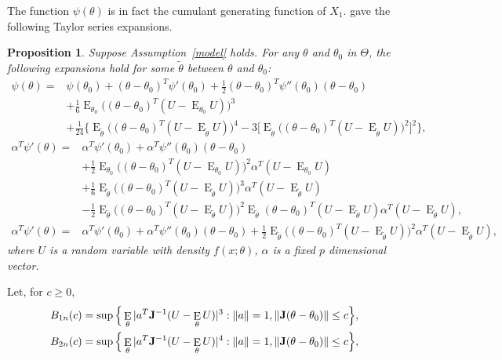 \documentclass[11pt, letterpaper]{article}
\DeclareMathOperator{\myE}{E}
\theoremstyle{plain}
\newtheorem{proposition}{\quad\quad Proposition}
\theoremstyle{definition}
\theoremstyle{remark}
\begin{document}
The function $\psi(\theta)$ is in fact the cumulant generating function of $X_1$. 
\cite{portnoy1988asymptotic} gave the following Taylor series expansions.
\begin{proposition}\label{Taylor}
    Suppose Assumption~\ref{model} holds.
    For any $\theta$ and $\theta_0$ in $\Theta$, the following expansions hold for some $\tilde{\theta}$ between $\theta$ and $\theta_0$:
    $$
    \begin{aligned}
        \psi(\theta)=&\psi(\theta_0)+(\theta-\theta_0)^T \psi'(\theta_0)+\frac{1}{2}(\theta-\theta_0)^T \psi''(\theta_0) (\theta-\theta_0)\\
        &+\frac{1}{6}\myE_{\theta_0}\Big((\theta-\theta_0)^T (U-\myE_{\theta_0}U)\Big)^3\\
        &+\frac{1}{24}\Big\{
            \myE_{\tilde{\theta}}\Big((\theta-\theta_0)^T (U-\myE_{\tilde\theta}U)\Big)^4-
            3\big[\myE_{\tilde{\theta}}\big((\theta-\theta_0)^T (U-\myE_{\tilde\theta}U)\big)^2\big]^2
            \Big\},
    \end{aligned}
    $$
    $$
    \begin{aligned}
        \alpha^T\psi'(\theta)=&\alpha^T \psi'(\theta_0)+\alpha^T \psi''(\theta_0) (\theta-\theta_0)\\
        &+\frac{1}{2}\myE_{\theta_0}\big((\theta-\theta_0)^T (U-\myE_{\theta_0}U)\big)^2 \alpha^T (U-\myE_{\theta_0}U)\\
        &+\frac{1}{6}
            \myE_{\tilde{\theta}}\big((\theta-\theta_0)^T (U-\myE_{\tilde\theta}U)\big)^3 \alpha^T (U-\myE_{\tilde\theta}U)\\
            &-\frac{1}{2}
            \myE_{\tilde{\theta}}\big((\theta-\theta_0)^T (U-\myE_{\tilde\theta}U)\big)^2
            \myE_{\tilde{\theta}}(\theta-\theta_0)^T (U-\myE_{\tilde\theta}U) \alpha^T (U-\myE_{\tilde\theta}U),
    \end{aligned}
    $$
    $$
    \begin{aligned}
        \alpha^T\psi'(\theta)=&\alpha^T \psi'(\theta_0)+\alpha^T \psi''(\theta_0) (\theta-\theta_0)
        +\frac{1}{2}\myE_{\tilde\theta}\big((\theta-\theta_0)^T (U-\myE_{\tilde\theta}U)\big)^2 \alpha^T (U-\myE_{\tilde\theta}U),
    \end{aligned}
    $$
    where $U$ is a random variable with density $f(x;\theta)$, $\alpha$ is a fixed $p$ dimensional vector.
\end{proposition}

Let, for $c\geq 0$,
$$
\begin{aligned}
    B_{1n}(c)&=\sup\Big\{\myE_{\theta}|a^T \BJ^{-1}(U-\myE_\theta U)|^3: \|a\|=1, \|\BJ(\theta-\theta_0)\|\leq c\Big\},\\
    B_{2n}(c)&=\sup\Big\{\myE_{\theta}|a^T \BJ^{-1}(U-\myE_\theta U)|^4: \|a\|=1, \|\BJ(\theta-\theta_0)\|\leq c\Big\},
\end{aligned}
$$
\end{document}
